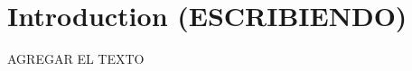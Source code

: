 \documentclass[../main.tex]{subfiles}
\begin{document}

\section{Introduction (ESCRIBIENDO)}
\label{sec:introduction}

AGREGAR EL TEXTO







\end{document}
